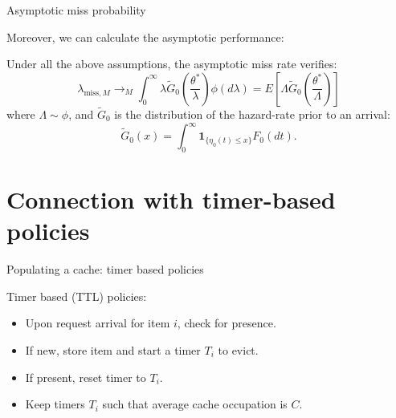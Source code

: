 \documentclass[aspectratio=169]{beamer}
\newcommand{\E}[1]{E\left[#1 \right]}
\newcommand{\ind}[1]{\mathbf{1}_{#1}}
\newenvironment*{myitem}[1][1.5em]{\begin{itemize}\setlength{\itemsep}{#1}}{\end{itemize}}
\begin{document}
\begin{frame}{Asymptotic miss probability}
	
	Moreover, we can calculate the asymptotic performance:

	\begin{theorem}
		Under all the above assumptions, the asymptotic \alert{miss rate} verifies:
		\begin{equation*}
			\lambda_{\text{miss},M} \to_M \int_0^\infty \lambda \tilde{G}_0\left(\frac{\theta^*}{\lambda}\right) \phi(d\lambda) = \E{\Lambda \tilde{G}_0\left(\frac{\theta^*}{\Lambda}\right)} 
		\end{equation*}
		where $\Lambda \sim \phi$, and $\tilde{G}_0$ is the distribution of the hazard-rate prior to an arrival:
		\begin{equation*}
			\tilde{G}_0(x) = \int_0^\infty \ind{\{\eta_0(t)\leqslant x\}} F_0(dt).
		\end{equation*}
	\end{theorem}
\end{frame}

\section{Connection with timer-based policies}

\begin{frame}{Populating a cache: timer based policies}
	
	\alert{Timer based (TTL) policies:}\vfill
	
	\begin{myitem}[1em]
		\item Upon request arrival for item $i$, check for presence.
		\item If new, store item and start a \alert{timer} $T_i$ to evict.
		\item If present, reset timer to $T_i$.
		\item Keep timers $T_i$ such that \alert{average} cache occupation is $C$.
	\end{myitem}
	
	\vspace{1.5em}
	
	\centering
	
\end{frame}
\end{document}
